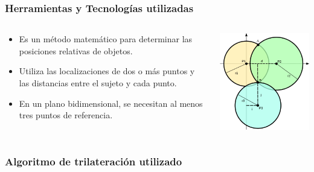 \begin{frame}
	\frametitle{Herramientas y Tecnologías utilizadas}
	\begin{columns}
			\begin{column}{0.6\textwidth}
					\begin{itemize}
						\item {Es un método matemático para determinar las posiciones relativas de objetos.}
						\item {Utiliza las localizaciones de dos o más puntos y las distancias entre el sujeto y cada punto.}
						\item {En un plano bidimensional, se necesitan al menos tres puntos de referencia.}
					\end{itemize}
				\endblock{}
			\end{column}
			\begin{column}{0.4\textwidth}
				\vfill 
					\begin{center}
						\includegraphics[width=0.8\linewidth]{Images/trilateration}
					\end{center}
			\end{column}
	\end{columns}
\end{frame}

\begin{frame}
	\frametitle{Algoritmo de trilateración utilizado}
	
\end{frame}

